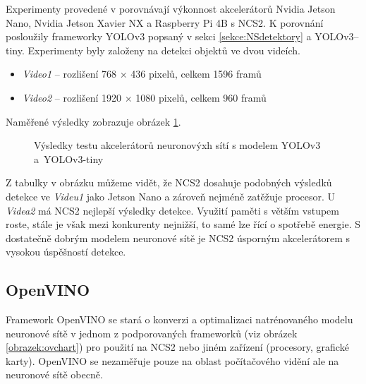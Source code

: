 Experimenty provedené v \cite{ncs2testYolo} porovnávají výkonnost akcelerátorů Nvidia Jetson Nano, Nvidia Jetson Xavier NX a Raspberry Pi 4B s NCS2. K porovnání posloužily frameworky YOLOv3 popsaný v sekci \ref{sekce:NSdetektory} a YOLOv3--tiny. Experimenty byly založeny na detekci objektů ve dvou videích.
\begin{itemize}
  \item \emph{Video1} -- rozlišení 768 $\times$ 436 pixelů, celkem 1596 framů
  \item \emph{Video2} -- rozlišení 1920 $\times$ 1080 pixelů, celkem 960 framů 
\end{itemize}

Naměřené výsledky zobrazuje obrázek \ref{obrazek:ncs2test}.

\begin{figure}[H]
  \begin{center}
  \label{obrazek:ncs2test}
  \caption{Výsledky testu akcelerátorů neuronovýxh sítí s modelem YOLOv3 a~YOLOv3-tiny \cite{ncs2testYolo}}
  \end{center}
\end{figure}

Z tabulky v obrázku můžeme vidět, že NCS2 dosahuje podobných výsledků detekce ve \emph{Videu1} jako Jetson Nano a zároveň nejméně zatěžuje procesor. U \emph{Videa2} má NCS2 nejlepší výsledky detekce. Využití paměti s větším vstupem roste, stále je však mezi konkurenty nejnižší, to samé lze řící o spotřebě energie. S dostatečně dobrým modelem neuronové sítě je NCS2 úsporným akcelerátorem s vysokou úspěšností detekce.


\subsection*{OpenVINO}
Framework OpenVINO se stará o konverzi a optimalizaci natrénovaného modelu neuronové sítě v jednom z podporovaných frameworků (viz obrázek \ref{obrazek:ovchart}) pro použití na NCS2 nebo jiném zařízení (procesory, grafické karty). OpenVINO se nezaměřuje pouze na oblast počítačového vidění ale na neuronové sítě obecně.

